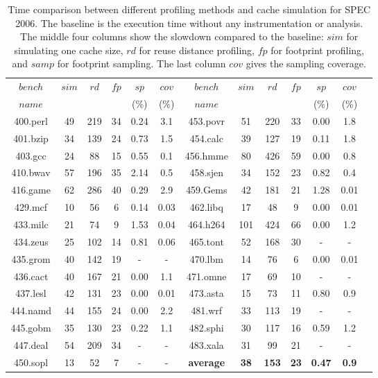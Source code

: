 \begin{table}
\small
\centering
\begin{tabular}{|c|c|c|c|c|c|c|c|c|c|c|c|c|}
\hline
$bench$ & $sim$ & $rd$ & $fp$ & $sp$ & $cov$ & $bench$ & $sim$ & $rd$ & $fp$ & $sp$ & $cov$ \\
$name$ & & & & (\%) & (\%) &$name$ & & & & (\%) & (\%) \\ \hline \hline
400.perl & 49 & 219 & 34 & 0.24 & 3.1 & 453.povr & 51 & 220 & 33 & 0.00 & 1.8 \\ \hline
401.bzip & 34 & 139 & 24 & 0.73 & 1.5 & 454.calc & 39 & 127 & 19 & 0.11 & 1.8 \\ \hline
403.gcc & 24 & 88 & 15 & 0.55 & 0.1 & 456.hmme & 80 & 426 & 59 & 0.00 & 0.8 \\ \hline
410.bwav & 57 & 196 & 35 & 2.14 & 0.5 & 458.sjen & 34 & 152 & 23 & 0.82 & 0.4 \\ \hline
416.game & 62 & 286 & 40 & 0.29 & 2.9 & 459.Gems & 42 & 181 & 21 & 1.28 & 0.01 \\ \hline
429.mcf & 10 & 56 & 6 & 0.14 & 0.03 & 462.libq & 17 & 48 & 9 & 0.00 & 0.01\\ \hline
433.milc & 21 & 74 & 9 & 1.53 & 0.04 & 464.h264 & 101 & 424 & 66 & 0.00 & 1.2 \\ \hline
434.zeus & 25 & 102 & 14 & 0.81 & 0.06 & 465.tont & 52 & 168 & 30 & - & - \\ \hline
435.grom & 40 & 142 & 19 & - & - & 470.lbm & 14 & 76 & 6 & 0.00 & 0.01 \\ \hline
436.cact & 40 & 167 & 21 & 0.00 & 1.1 & 471.omne & 17 & 69 & 10 & - & - \\ \hline
437.lesl & 42 & 131 & 23 & 0.00 & 0.01 & 473.asta & 15 & 73 & 11 & 0.80 & 0.9 \\ \hline
444.namd & 44 & 155 & 24 & 0.00 & 2.2 & 481.wrf & 33 & 113 & 19 & - & - \\ \hline
445.gobm & 35 & 130 & 23 & 0.22 & 1.1 & 482.sphi & 30 & 117 & 16 & 0.59 & 1.2\\ \hline
447.deal & 54 & 209 & 34 & - & - & 483.xala & 31 & 99 & 21 & - & - \\ \hline
450.sopl & 13 & 52 & 7 & - & - & {\bf average} & {\bf 38} & {\bf 153} & {\bf 23} & {\bf 0.47} & {\bf 0.9}\\ \hline
\end{tabular}
\caption{Time comparison between different profiling methods and
  cache simulation for SPEC 2006.
  The baseline is the execution time without any 
  instrumentation or analysis. The middle four columns show the
  slowdown compared to the baseline:
$sim$ for simulating one cache size, $rd$
 for reuse distance profiling, $fp$ for footprint profiling, and
  $samp$ for footprint sampling.  The last column $cov$ gives the sampling coverage.
}
\label{tbl:speed}
\end{table}


